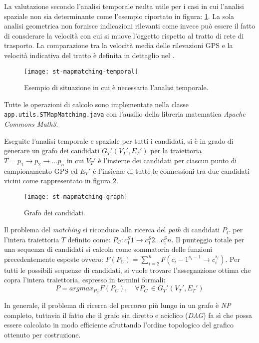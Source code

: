La valutazione secondo l'analisi temporale rsulta utile per i casi in cui l'analisi spaziale non sia determinante come l'esempio riportato in figura: \ref{fig:st-mapmatching-temporal}. La sola analisi geometrica non fornisce indicazioni rilevanti come invece può essere il fatto di consderare la velocità con cui si muove l'oggetto rispetto al tratto di rete di trasporto. La comparazione tra la velocità media delle rilevazioni GPS e la velocità indicativa del tratto è definita in dettaglio nel \cite[paragrafo 5.3]{stmapmatching}.
\begin{figure}[h]
  \centering
  \texttt{[image: st-mapmatching-temporal]}
  \caption{\footnotesize{Esempio di situazione in cui è necessaria l'analisi temporale.}}
  \label{fig:st-mapmatching-temporal}
\end{figure}

Tutte le operazioni di calcolo sono implementate nella classe \texttt{app.\-utils.\-STMapMatching.java} con l'ausilio della libreria matematica \emph{Apache Commons Math3}.

Eseguite l'analisi temporale e spaziale per tutti i candidati, si è in grado di generare un grafo dei candidati $G_T'(V_T', E_T')$ per la traiettoria $T=p_1 \rightarrow p_2 \rightarrow ... p_n$ in cui $V_T'$ è l'insieme dei candidati per ciascun punto di campionamento GPS ed $E_T'$ è l'insieme di tutte le connessioni tra due candidati vicini come rappresentato in figura \ref{fig:st-mapmatching-graph}.
\begin{figure}[h]
  \centering
  \texttt{[image: st-mapmatching-graph]}
  \caption{\footnotesize{Grafo dei candidati.}}
  \label{fig:st-mapmatching-graph}
\end{figure}

Il problema del \emph{matching} si riconduce alla ricerca del \emph{path} di candidati $P_C$ per l'intera traiettoria $T$ definito come: $P_C: c_1^S1 \rightarrow c_1^S2 ... c_1^Sn$. Il punteggio totale per una sequenza di candidati si calcola come sommatoria delle funzioni precedentemente esposte ovvero: $F(P_C)=\sum_{i=2}^{n} F(c_i-1^{s_i-1} \rightarrow c_i^{s_i})$. Per tutti le possibili sequenze di candidati, si vuole trovare l'assegnazione ottima che copra l'intera traiettoria, espresso in termini formali:
$$P=arg max_{P_C} F(P_C), \quad \forall P_C \, \in G_T'(V_T', E_T')$$

In generale, il problema di ricerca del percorso più lungo in un grafo è \emph{NP} completo, tuttavia il fatto che il grafo sia diretto e aciclico (\emph{DAG}) fa sì che possa essere calcolato in modo efficiente sfruttando l'ordine topologico del grafico ottenuto per costruzione.

